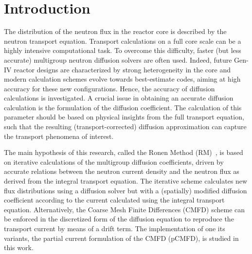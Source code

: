 \section{Introduction}
\label{sec:intro}

The distribution of the neutron flux in the reactor core is described by the neutron transport equation. Transport calculations on a full core scale can be a highly intensive computational task. To overcome this difficulty, faster (but less accurate) multigroup neutron diffusion solvers are often used. Indeed, future Gen-IV reactor designs are characterized by strong heterogeneity in the core and modern calculation schemes evolve towards best-estimate codes, aiming at high accuracy for these new configurations. Hence, the accuracy of diffusion calculations is investigated. A crucial issue in obtaining an accurate diffusion calculation is the formulation of the diffusion coefficient. The calculation of this parameter should be based on physical insights from the full transport equation, such that the resulting (transport-corrected) diffusion approximation can capture the transport phenomena of interest.

The main hypothesis of this research, called the Ronen Method (RM)~\cite{Ronen-2004,Tomatis-2011}, is based on iterative calculations of the multigroup diffusion coefficients, driven by accurate relations between the neutron current density and the neutron flux as derived from the integral transport equation. The iterative scheme calculates new flux distributions using a diffusion solver but with a (spatially) modified diffusion coefficient according to the current calculated using the integral transport equation. Alternatively, the Coarse Mesh Finite Differences (CMFD) scheme can be enforced in the discretized form of the diffusion equation to reproduce the transport current by means of a drift term. The implementation of one its variants, the partial current formulation of the CMFD (pCMFD), is studied in this work.
%

